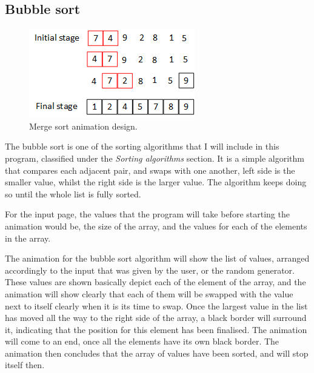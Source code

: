 
\newpage

\subsection{Bubble sort}

\begin{figure}[H]
\centering
\includegraphics[scale=1.5]{images/report_images/animationDesignBubbleSort.png}
\caption{Merge sort animation design.}
\label{animationDesignBubbleSort}
\end{figure}

The bubble sort is one of the sorting algorithms that I will include in this program, classified under the \textit{Sorting algorithms} section. It is a simple algorithm that compares each adjacent pair, and swaps with one another, left side is the smaller value, whilst the right side is the larger value. The algorithm keeps doing so until the whole list is fully sorted.

For the input page, the values that the program will take before starting the animation would be, the size of the array, and the values for each of the elements in the array.

The animation for the bubble sort algorithm will show the list of values, arranged accordingly to the input that was given by the user, or the random generator. These values are shown basically depict each of the element of the array, and the animation will show clearly that each of them will be swapped with the value next to itself clearly when it is its time to swap. Once the largest value in the list has moved all the way to the right side of the array, a black border will surround it, indicating that the position for this element has been finalised. The animation will come to an end, once all the elements have its own black border. The animation then concludes that the array of values have been sorted, and will stop itself then.

\newpage
{}


